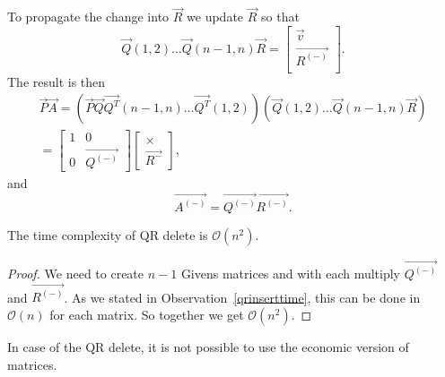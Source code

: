 To propagate the change into $\vec{R}$ we update $\vec{R}$ so that
\begin{equation}
    \vec{Q}(1,2) \ldots \vec{Q}(n-1,n) \vec{R} =   \begin{bmatrix}
        \vec{v} \\
        \vec{R^{(-)}}\\
    \end{bmatrix}.
\end{equation}
The result is then
\begin{multline}
    \vec{P}\vec{A} = (\vec{P}\vec{Q}  \vec{Q^T}(n-1,n) \ldots   \vec{Q^T}(1,2)) (\vec{Q}(1,2) \ldots \vec{Q}(n-1,n) \vec{R} ) \\
    = 
    \begin{bmatrix}
        1 & 0 \\
        0 & \vec{Q^{(-)}}
    \end{bmatrix}
    \begin{bmatrix}
        \times \\
        \vec{R^{-}}
    \end{bmatrix},
\end{multline}
and 
\begin{equation}
    \vec{A^{(-)}} = \vec{Q^{(-)}}\vec{R^{(-)}}.
\end{equation}

\begin{observation} \label{qrdeletetime}
The time complexity of QR delete is   $\mathcal{O}(n^2)$.
\end{observation}

\begin{proof}
We need to create $n-1$ Givens matrices and with each multiply $\vec{Q^{(-)}}$ and $\vec{R^{(-)}}$. As we stated in Observation~\ref{qrinserttime}, this can be done in $\mathcal{O}(n)$ for each matrix.
So together we get $\mathcal{O}(n^2)$.
\end{proof}

\begin{note}
In case of the QR delete, it is not possible to use the economic version of matrices.
\end{note}







